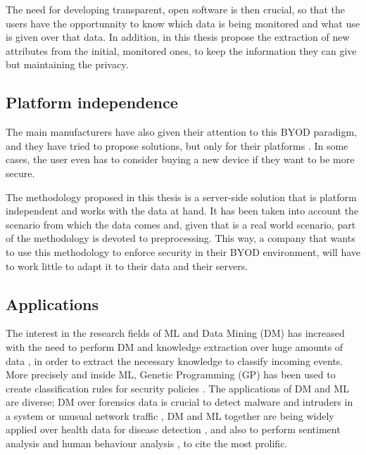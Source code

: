 The need for developing transparent, open software is then crucial, so that the users have the opportunnity to know which data is being monitored and what use is given over that data. In addition, in this thesis propose the extraction of new attributes from the initial, monitored ones, to keep the information they can give but maintaining the privacy.

\subsection{Platform independence}
\label{subsec:platf_ind}

The main manufacturers have also given their attention to this BYOD paradigm, and they have tried to propose solutions, but only for their platforms \cite{de2015corporate}. In some cases, the user even has to consider buying a new device if they want to be more secure.

The methodology proposed in this thesis is a server-side solution that is platform independent and works with the data at hand. It has been taken into account the scenario from which the data comes and, given that is a real world scenario, part of the methodology is devoted to preprocessing. This way, a company that wants to use this methodology to enforce security in their BYOD environment, will have to work little to adapt it to their data and their servers.

\subsection{Applications}
\label{subsec:apps}

The interest in the research fields of ML and Data Mining (DM) has increased with the need to perform DM and knowledge extraction over huge amounts of data \cite{witten2016data}, in order to extract the necessary knowledge to classify incoming events. More precisely and inside ML, Genetic Programming (GP) has been used to create classification rules for security policies \cite{freitas2002data, DeFalco2002257, sec_policy_evolution_gp_08, pol_evol_gp_3_approaches_08}. The applications of DM and ML are diverse; DM over forensics data is crucial to detect malware \cite{Ma:2011:LDM:1961189.1961202, DeVel2001} and intruders in a system \cite{Jaswal2015} or unusual network traffic \cite{Shalaginov2017359}, DM and ML together are being widely applied over health data for disease detection \cite{Murdoch20131351}, and also to perform sentiment analysis \cite{Poria201445, Ravi201514} and human behaviour analysis \cite{Kosinski20135802}, to cite the most prolific.

